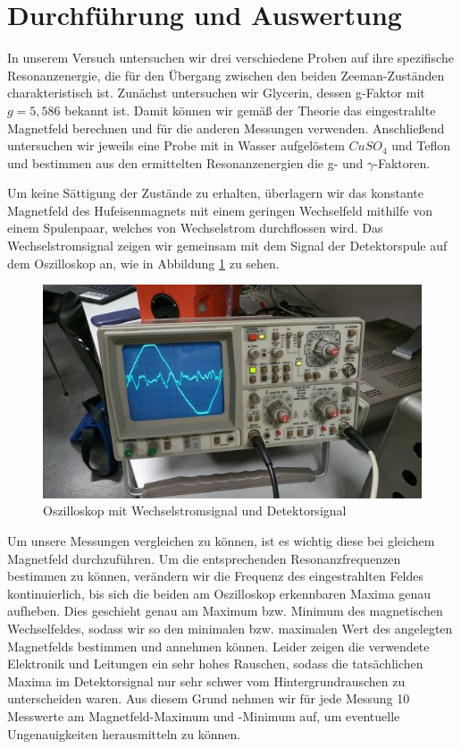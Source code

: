 \section{Durchführung und Auswertung}
In unserem Versuch untersuchen wir drei verschiedene Proben auf ihre spezifische Resonanzenergie, die für den Übergang zwischen den beiden Zeeman-Zuständen charakteristisch ist. Zunächst untersuchen wir Glycerin, dessen g-Faktor mit $g=5,586$ bekannt ist. Damit können wir gemäß der Theorie das eingestrahlte Magnetfeld berechnen und für die anderen Messungen verwenden. Anschließend untersuchen wir jeweils eine Probe mit in Wasser aufgelöstem $CuSO_4$ und Teflon und bestimmen aus den ermittelten Resonanzenergien die g- und $\gamma$-Faktoren.

Um keine Sättigung der Zustände zu erhalten, überlagern wir das konstante Magnetfeld des Hufeisenmagnets mit einem geringen Wechselfeld mithilfe von einem Spulenpaar, welches von Wechselstrom durchflossen wird. Das Wechselstromsignal zeigen wir gemeinsam mit dem Signal der Detektorspule auf dem Oszilloskop an, wie in Abbildung \ref{oszi} zu sehen. 

\begin{figure}[htbp] 
     \includegraphics[scale=0.5]{Oszi.jpg}
  \caption{Oszilloskop mit Wechselstromsignal und Detektorsignal}
  \label{oszi}
\end{figure}

Um unsere Messungen vergleichen zu können, ist es wichtig diese bei gleichem Magnetfeld durchzuführen. Um die entsprechenden Resonanzfrequenzen bestimmen zu können, verändern wir die Frequenz des eingestrahlten Feldes kontinuierlich, bis sich die beiden am Oszilloskop erkennbaren Maxima genau aufheben. Dies geschieht genau am Maximum bzw. Minimum des magnetischen Wechselfeldes, sodass wir so den minimalen bzw. maximalen Wert des angelegten Magnetfelds bestimmen und annehmen können. Leider zeigen die verwendete Elektronik und Leitungen ein sehr hohes Rauschen, sodass die tatsächlichen Maxima im Detektorsignal nur sehr schwer vom Hintergrundrauschen zu unterscheiden waren. Aus diesem Grund nehmen wir für jede Messung 10 Messwerte am Magnetfeld-Maximum und -Minimum auf, um eventuelle Ungenauigkeiten herausmitteln zu können. 

